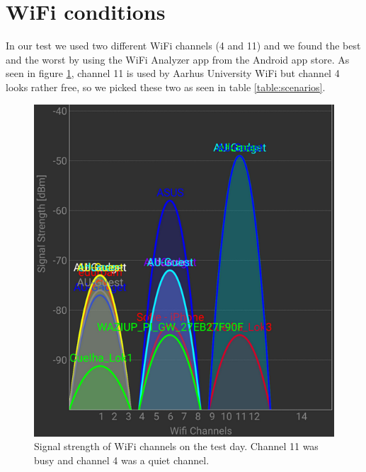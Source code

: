 \section{WiFi conditions}\label{sc:wifi}
In our test we used two different WiFi channels (4 and 11) and we found the best and the worst by using the WiFi Analyzer app from the Android app store\cite{Farproc@gmail.com2018}. As seen in figure \ref{fig:wifionthetestday}, channel 11 is used by Aarhus University WiFi but channel 4 looks rather free, so we picked these two as seen in table \ref{table:scenarios}.

\begin{figure}[h]
	\centering
	\includegraphics[width=1\linewidth]{testAndPerformance/wifi/wifiOnTheTestDay}
	\caption{Signal strength of WiFi channels on the test day. Channel 11 was busy and channel 4 was a quiet channel.}
	\label{fig:wifionthetestday}
\end{figure}
